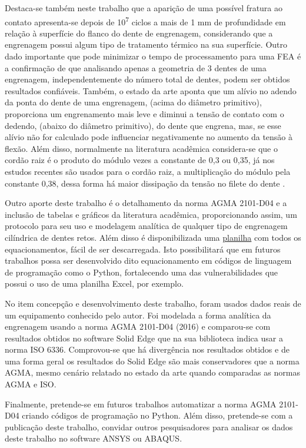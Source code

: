 \documentclass[12pt,a4paper]{article}
\begin{document}
Destaca-se também neste trabalho que a aparição de uma possível fratura
ao contato apresenta-se depois de 10\textsuperscript{7} ciclos a mais de
1 mm de profundidade em relação à superfície do flanco do dente de
engrenagem, considerando que a engrenagem possui algum tipo de
tratamento térmico na sua superfície. Outro dado importante que pode
minimizar o tempo de processamento para uma FEA é a confirmação de que
analisando apenas a geometria de 3 dentes de uma engrenagem,
independentemente do número total de dentes, podem ser obtidos
resultados confiáveis. Também, o estado da arte aponta que um alívio no
adendo da ponta do dente de uma engrenagem, (acima do diâmetro
primitivo), proporciona um engrenamento mais leve e diminui a tensão de
contato com o dedendo, (abaixo do diâmetro primitivo), do dente que
engrena, mas, se esse alívio não for calculado pode influenciar
negativamente no aumento da tensão à flexão. Além disso, normalmente na
literatura acadêmica considera-se que o cordão raiz é o produto do
módulo vezes a constante de 0,3 ou 0,35, já nos estudos recentes são
usados para o cordão raiz, a multiplicação do módulo pela constante
0,38, dessa forma há maior dissipação da tensão no filete do dente .

Outro aporte deste trabalho é o detalhamento da norma AGMA 2101-D04 e a
inclusão de tabelas e gráficos da literatura acadêmica, proporcionando
assim, um protocolo para seu uso e modelagem analítica de qualquer tipo
de engrenagem cilíndrica de dentes retos. Além disso é disponibilizada
uma
\href{https://docs.google.com/spreadsheets/d/19pnUCaySImdiL_x95e3OEQRMFw082qtCaUppl3dgY9c/edit?usp=sharing}{planilha}
com todos os equacionamentos, fácil de ser descarregada. Isto
possibilitará que em futuros trabalhos possa ser desenvolvido dito
equacionamento em códigos de linguagem de programação como o Python,
fortalecendo uma das vulnerabilidades que possui o uso de uma planilha
Excel, por exemplo.

No item concepção e desenvolvimento deste trabalho, foram usados dados
reais de um equipamento conhecido pelo autor. Foi modelada a forma
analítica da engrenagem usando a norma AGMA 2101-D04 (2016) e
comparou-se com resultados obtidos no software Solid Edge que na sua
biblioteca indica usar a norma ISO 6336. Comprovou-se que há divergência
nos resultados obtidos e de uma forma geral os resultados do Solid Edge
são mais conservadores que a norma AGMA, mesmo cenário relatado no
estado da arte quando comparadas as normas AGMA e ISO.

Finalmente, pretende-se em futuros trabalhos automatizar a norma AGMA
2101-D04 criando códigos de programação no Python. Além disso,
pretende-se com a publicação deste trabalho, convidar outros
pesquisadores para analisar os dados deste trabalho no software ANSYS ou
ABAQUS.
\end{document}
